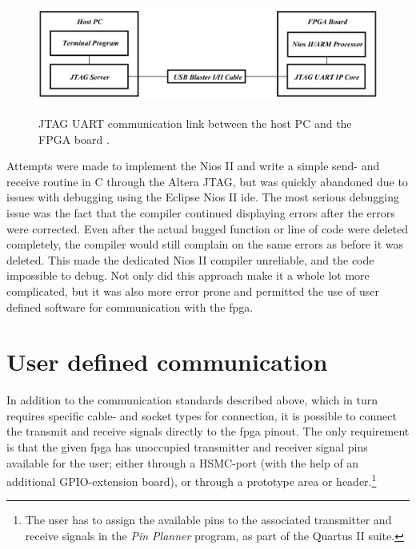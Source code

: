 \documentclass[main.tex]{subfiles}
\begin{document}
\begin{figure}[H] %
\includegraphics[width = 12 cm]{../img/altera_jtag}  \\[0.1 cm]
\caption{JTAG UART communication link between the host PC and the FPGA board \cite[Figure 1]{altera_terminals14}.}
\label{fig:altjtag}
\end{figure}

Attempts were made to implement the Nios II and write a simple send- and receive routine in C through the Altera JTAG, but was quickly abandoned due to issues with debugging using the Eclipse Nios II \acrshort{ide}. The most serious debugging issue was the fact that the compiler continued displaying errors after the errors were corrected. Even after the actual bugged function or line of code were deleted completely, the compiler would still complain on the same errors as before it was deleted. This made the dedicated Nios II compiler unreliable, and the code impossible to debug. Not only did this approach make it a whole lot more complicated, but it was also more error prone and permitted the use of user defined software for communication with the \gls{fpga}.

\section{User defined communication} \label{sec:usercom}

In addition to the communication standards described above, which in turn requires specific cable- and socket types for connection, it is possible to connect the transmit and receive signals directly to the \gls{fpga} pinout. The only requirement is that the given \gls{fpga} has unoccupied transmitter and receiver signal pins available for the user; either through a HSMC-port (with the help of an additional GPIO-extension board), or through a prototype area or header.\footnote{The user has to assign the available pins to the associated transmitter and receive signals in the \textit{Pin Planner} program, as part of the Quartus II suite.}\\
\end{document}
